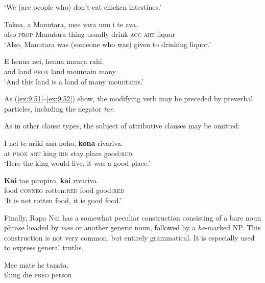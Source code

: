 \glt 
‘We (are people who) don’t eat chicken intestines.’ \textstyleExampleref{[Ley-8-53.008]}
\z

\ea\label{ex:9.52}
\gll Toko{\ꞌ}a, a Manutara, me{\ꞌ}e vara unu i te {\ꞌ}ava. \\
also \textsc{prop} Manutara thing usually drink \textsc{acc} \textsc{art} liquor \\

\glt 
‘Also, Manutara was (someone who was) given to drinking liquor.’ \textstyleExampleref{[R309.055]} 
\z

\ea\label{ex:9.53}
\gll {\ꞌ}E henua nei, henua ma{\ꞌ}uŋa rahi. \\
and land \textsc{prox} land mountain many \\

\glt
‘And this land is a land of many mountains.’ \textstyleExampleref{[R348.004]} 
\z

As (\ref{ex:9.51}–\ref{ex:9.52}) show, the modifying verb may be preceded by preverbal particles, including the negator \textit{ta{\ꞌ}e}.

As in other clause types, the subject of attributive clauses may be omitted:

\ea\label{ex:9.54}
\gll {\ꞌ}I nei te {\ꞌ}ariki ana noho, \textbf{kona} rivariva. \\
at \textsc{prox} \textsc{art} king \textsc{irr} stay place good:\textsc{red} \\

\glt 
‘Here the king would live, it was a good place.’ \textstyleExampleref{[Mtx-2-01.031]}
\z

\ea\label{ex:9.55}
\gll \textbf{Kai} ta{\ꞌ}e piropiro, \textbf{kai} rivariva. \\
food \textsc{conneg} rotten:\textsc{red} food good:\textsc{red} \\

\glt 
‘It is not rotten food, it is good food.’ \textstyleExampleref{[R310.382]} 
\z

Finally, Rapa Nui has a somewhat peculiar construction consisting of a bare noun phrase headed by \textit{me{\ꞌ}e} or another generic noun, followed by a \textit{he}{}-marked NP. This construction is not very common, but entirely grammatical. It is especially used to express general truths.

\ea\label{ex:9.56}
\gll Me{\ꞌ}e mate he taŋata. \\
thing die \textsc{pred} person \\

